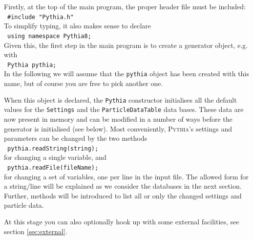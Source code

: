 \documentclass{elsartmod}
\newcommand{\cindent}{\hspace*{10mm}~}
\begin{document}
Firstly, at the top of the main program, the proper header file must
be included:\\
\cindent \texttt{\#include "Pythia.h"}\\
To simplify typing, it also makes sense to declare\\
\cindent \texttt{using namespace Pythia8;}\\ 
Given this, the first step in the main program is to create a 
generator object, e.g. with\\
\cindent \texttt{Pythia pythia;}\\
In the following we will assume that the \texttt{pythia} object
has been created with this name, but of course you are free to
pick another one.  

When this object is declared, 
the \texttt{Pythia} constructor initialises all
the default values for the \texttt{Settings} and the
\texttt{ParticleDataTable} data bases. These data are now present in
memory and can be modified in a number of ways before the generator is
initialised (see below). 
Most conveniently, \textsc{Pythia}'s settings and parameters can be
changed by the two methods\\
\cindent \texttt{pythia.readString(string);}\\
for changing a single variable, and\\
\cindent \texttt{pythia.readFile(fileName);}\\
for changing a set of variables, one per line in the input file. 
The allowed form for a string/line will be explained as we consider 
the databases in the next section. Further, methods will be introduced 
to list all or only the changed settings and particle data.

At this stage you can also optionally hook up with some external 
facilities, see section \ref{sec:external}.
\end{document}
